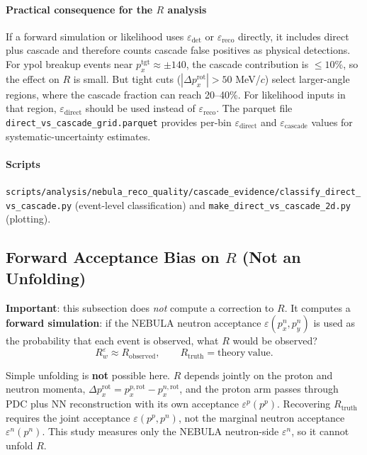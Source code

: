 \documentclass[a4paper,11pt]{article}
\begin{document}
\paragraph{Practical consequence for the $R$ analysis}
If a forward simulation or likelihood uses $\varepsilon_\mathrm{det}$ or
$\varepsilon_\mathrm{reco}$ directly, it includes direct plus cascade and
therefore counts cascade false positives as physical detections. For ypol
breakup events near $p_x^\mathrm{tgt}\approx \pm 140$, the cascade contribution
is $\leq 10\%$, so the effect on $R$ is small. But tight cuts
($|\Delta p_x^\mathrm{rot}|>50$ MeV/$c$) select larger-angle regions, where the
cascade fraction can reach 20--40\%. For likelihood inputs in that region,
$\varepsilon_\mathrm{direct}$ should be used instead of
$\varepsilon_\mathrm{reco}$. The parquet file
\texttt{direct\_vs\_cascade\_grid.parquet} provides per-bin
$\varepsilon_\mathrm{direct}$ and $\varepsilon_\mathrm{cascade}$ values for
systematic-uncertainty estimates.

\paragraph{Scripts}
\texttt{scripts/analysis/nebula\_reco\_quality/cascade\_evidence/classify\_direct\_vs\_cascade.py}
(event-level classification) and
\texttt{make\_direct\_vs\_cascade\_2d.py} (plotting).

\subsection{Forward Acceptance Bias on $R$ (Not an Unfolding)}

\textbf{Important}: this subsection does \emph{not} compute a correction to
$R$. It computes a \textbf{forward simulation}: if the NEBULA neutron acceptance
$\varepsilon(p_x^n,p_y^n)$ is used as the probability that each event is
observed, what $R$ would be observed?
\[
R_w^\varepsilon \approx R_\mathrm{observed},
\qquad
R_\mathrm{truth} = \mathrm{theory\ value}.
\]

Simple unfolding is \textbf{not} possible here. $R$ depends jointly on the
proton and neutron momenta,
$\Delta p_x^\mathrm{rot}=p_x^{p,\mathrm{rot}}-p_x^{n,\mathrm{rot}}$, and the
proton arm passes through PDC plus NN reconstruction with its own acceptance
$\varepsilon^p(p^p)$. Recovering $R_\mathrm{truth}$ requires the joint
acceptance $\varepsilon(p^p,p^n)$, not the marginal neutron acceptance
$\varepsilon^n(p^n)$. This study measures only the NEBULA neutron-side
$\varepsilon^n$, so it cannot unfold $R$.
\end{document}
